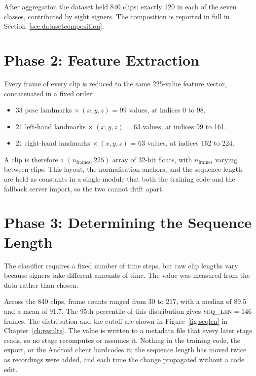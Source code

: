 After aggregation the dataset held 840 clips: exactly 120 in each of the seven classes, contributed by eight signers. The composition is reported in full in Section~\ref{sec:datasetcomposition}.

\section{Phase 2: Feature Extraction}

Every frame of every clip is reduced to the same 225-value feature vector, concatenated in a fixed order:

\begin{itemize}
    \item 33 pose landmarks $\times\ (x, y, z)$ = 99 values, at indices 0 to 98.
    \item 21 left-hand landmarks $\times\ (x, y, z)$ = 63 values, at indices 99 to 161.
    \item 21 right-hand landmarks $\times\ (x, y, z)$ = 63 values, at indices 162 to 224.
\end{itemize}

\noindent A clip is therefore a $(n_{\text{frames}}, 225)$ array of 32-bit floats, with $n_{\text{frames}}$ varying between clips. This layout, the normalisation anchors, and the sequence length are held as constants in a single module that both the training code and the fallback server import, so the two cannot drift apart.

\section{Phase 3: Determining the Sequence Length}

The classifier requires a fixed number of time steps, but raw clip lengths vary because signers take different amounts of time. The value was measured from the data rather than chosen.

Across the 840 clips, frame counts ranged from 30 to 217, with a median of 89.5 and a mean of 91.7. The 95th percentile of this distribution gives $\textsc{seq\_len} = 146$ frames. The distribution and the cutoff are shown in Figure~\ref{fig:seqlen} in Chapter~\ref{ch:results}. The value is written to a metadata file that every later stage reads, so no stage recomputes or assumes it. Nothing in the training code, the export, or the Android client hardcodes it; the sequence length has moved twice as recordings were added, and each time the change propagated without a code edit.

